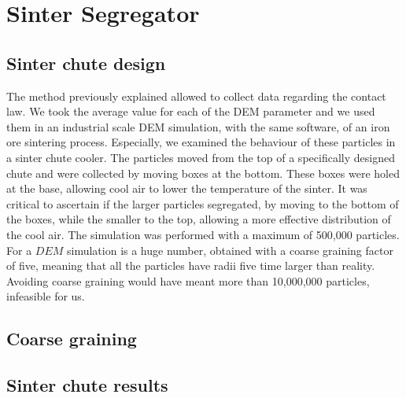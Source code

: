 
\chapter{Sinter Segregator}
\label{cap:sintersegregator}

\section{Sinter chute design}
\label{sec:sinterchutedesign}

The method previously explained allowed to collect data regarding the contact
law. We took the average value for each of the \acs{DEM} parameter and we used them 
in an industrial scale \acs{DEM} simulation, with the same software, 
of an iron ore sintering process. 
Especially, we examined the behaviour of these particles in a sinter chute cooler. 
The particles moved from the top of a specifically designed chute and were 
collected by moving boxes at the bottom. These boxes were holed at the base, 
allowing cool air to lower the temperature of the sinter. 
It was critical to ascertain if the larger particles segregated, 
by moving to the bottom of the boxes, while the smaller to the top, allowing a 
more effective distribution of the cool air. The simulation was performed 
with a maximum of 500,000 particles.
For a $DEM$ simulation is a huge number, obtained with a coarse graining factor
of five, meaning that all the particles have radii five time larger than reality.
Avoiding coarse graining would have meant more than 10,000,000 particles,
infeasible for us.

\section{Coarse graining}
\label{sec:coarsegraining}

\section{Sinter chute results}
\label{sec:sinterchuteresults}

